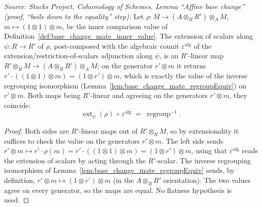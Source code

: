 \begin{lemma}

  \label{lem:base_change_mate_gstar_generator_close}
  \textit{Source: Stacks Project, Cohomology of Schemes, Lemma ``Affine base change''
  (proof, ``boils down to the equality'' step).}
  Let \(\rho : M \to (A \otimes_R R') \otimes_A M\), \(m \mapsto (1 \otimes 1) \otimes m\), be the
  inner comparison value of Definition~\ref{def:base_change_mate_inner_value}. The extension of
  scalars along \(\psi : R \to R'\) of \(\rho\), post-composed with the algebraic counit
  \(\varepsilon^{\mathrm{alg}}\) of the extension/restriction-of-scalars adjunction along \(\psi\),
  is an \(R'\)-linear map \(R' \otimes_R M \to (A \otimes_R R') \otimes_A M\); on the generator
  \(r' \otimes m\) it returns \(r' \cdot ((1 \otimes 1) \otimes m) = (1 \otimes r') \otimes m\),
  which is exactly the value of the inverse regrouping isomorphism
  (Lemma~\ref{lem:base_change_mate_regroupEquiv}) on \(r' \otimes m\). Both maps being
  \(R'\)-linear and agreeing on the generators \(r' \otimes m\), they coincide:
  \[
    \operatorname{ext}_\psi(\rho) \,\circ\, \varepsilon^{\mathrm{alg}}
      \;=\; \operatorname{regroup}^{-1}.
  \]
\end{lemma}
\begin{proof}
  Both sides are \(R'\)-linear maps out of \(R' \otimes_R M\), so by extensionality it suffices to
  check the value on the generators \(r' \otimes m\). The left side sends
  \(r' \otimes m \mapsto r' \cdot \rho(m) = r' \cdot ((1 \otimes 1) \otimes m) =
  (1 \otimes r') \otimes m\), using that \(\varepsilon^{\mathrm{alg}}\) reads the extension of
  scalars by acting through the \(R'\)-scalar. The inverse regrouping isomorphism of
  Lemma~\ref{lem:base_change_mate_regroupEquiv} sends, by definition,
  \(r' \otimes m \mapsto (1 \otimes r') \otimes m\) (in the \(A \otimes_R R'\) orientation). The two
  values agree on every generator, so the maps are equal. No flatness hypothesis is used.
\end{proof}

